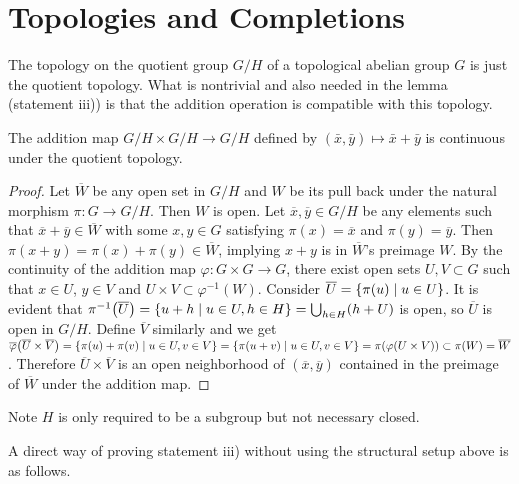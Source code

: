 \documentclass{note}
\begin{document}
\section*{Topologies and Completions}

The topology on the quotient group $G/H$ of a topological abelian group $G$ is
just the quotient topology. What is nontrivial and also needed in the lemma
(statement iii)) is that the addition operation is compatible with this
topology.

\begin{lemma*}
  The addition map $G/H \times G/H \to G/H$ defined by $(\bar{x},\bar{y}) \mapsto
    \bar{x}+\bar{y}$ is continuous under the quotient topology.
\end{lemma*}

\begin{proof}
  Let $\overline{W}$ be any open set in $G/H$ and $W$ be its pull back under the
  natural morphism $\pi\colon G \to G/H$. Then $W$ is open. Let $\overline{x},
    \overline{y} \in G/H$ be any elements such that $\overline{x} + \overline{y}
    \in \overline{W}$ with some $x, y \in G$ satisfying $\pi(x) = \overline{x}$ and
  $\pi(y) = \overline{y}$. Then $\pi(x + y) = \pi(x) + \pi(y) \in \overline{W}$,
  implying $x + y$ is in $\overline{W}$'s preimage $W$. By the continuity of the
  addition map $\varphi\colon G \times G \to G$, there exist open sets $U,V
    \subset G$ such that $x\in U$, $y\in V$ and $U\times V \subset
    \varphi^{-1}(W)$. Consider $\overline{U} = \setbuilder{\pi(u)}{u \in U}$. It is
  evident that $\pi^{-1}\left(\overline{U}\right) = \setbuilder{u+h}{u \in U, h
      \in H} = \bigcup_{h\in H}(h+U)$ is open, so $\overline{U}$ is open in $G/H$.
  Define $\overline{V}$ similarly and we get
  $\overline\varphi\left(\overline{U}\times\overline{V}\right) =
    \setbuilder{\pi(u)+\pi(v)}{u\in U, v\in V} = \setbuilder{\pi(u+v)}{u\in U, v\in
      V} = \pi\left(\varphi\left(U\times V\right)\right) \subset \pi(W) =
    \overline{W}$. Therefore $\overline{U} \times \overline{V}$ is an open
  neighborhood of $\left(\overline{x}, \overline{y}\right)$ contained in the
  preimage of $\overline{W}$ under the addition map.
\end{proof}

\begin{remark*}
  Note $H$ is only required to be a subgroup but not necessary closed.
\end{remark*}

A direct way of proving statement iii) without using the structural setup above
is as follows.
\end{document}
